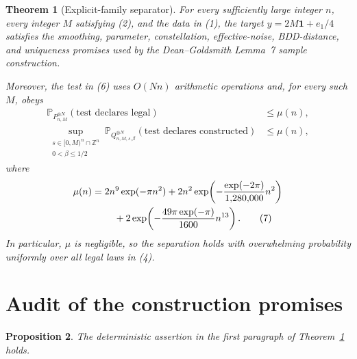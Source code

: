 \documentclass[11pt]{article}
\newtheorem{theorem}{Theorem}
\newtheorem{proposition}[theorem]{Proposition}
\theoremstyle{remark}
\newcommand{\Z}{\mathbb Z}
\newcommand{\one}{\mathbf 1}
\newcommand{\Prob}{\mathbb P}
\begin{document}
\begin{theorem}[Explicit-family separator]\label{thm:main}
For every sufficiently large integer \(n\), every integer \(M\)
satisfying \emph{(2)}, and the data in \emph{(1)}, the target
\(y=2M\one+e_1/4\) satisfies the smoothing, parameter, constellation,
effective-noise, BDD-distance, and uniqueness promises used by the
Dean--Goldsmith Lemma~7 sample construction.

Moreover, the test in \emph{(6)} uses \(O(Nn)\) arithmetic operations
and, for every such \(M\), obeys
\begin{align*}
 \Prob_{P_{n,M}^{\otimes N}}(\text{test declares legal})
   &\le \mu(n),\\
 \sup_{\substack{s\in{[0,M)}^n\cap\Z^n\\0<\beta\le1/2}}
 \Prob_{Q_{n,M,s,\beta}^{\otimes N}}
   (\text{test declares constructed})
   &\le \mu(n),
\end{align*}
where
\begin{align}
 \mu(n)={}&2n^9\exp(-\pi n^2)
 +2n^2\exp\!\left(
 -\frac{\exp(-2\pi)}{1{,}280{,}000}n^2\right)
 \notag\\
 &\quad+2\exp\!\left(
 -\frac{49\pi\exp(-\pi)}{1600}n^{13}\right).
 \tag{7}
\end{align}
In particular, \(\mu\) is negligible, so the separation holds with
overwhelming probability uniformly over all legal laws in \emph{(4)}.
\end{theorem}

\section{Audit of the construction promises}

\begin{proposition}\label{prop:promises}
The deterministic assertion in the first paragraph of
Theorem~\ref{thm:main} holds.
\end{proposition}
\end{document}
